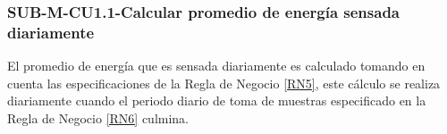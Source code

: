 \subsubsection{SUB-M-CU1.1-Calcular promedio de energía sensada diariamente}\label{SUB-M-CU1.1}
El promedio de energía que es sensada diariamente es calculado tomando en cuenta las especificaciones de la Regla de Negocio \ref{RN5}, este cálculo se realiza diariamente cuando el periodo diario de toma de muestras especificado en la Regla de Negocio \ref{RN6} culmina.

